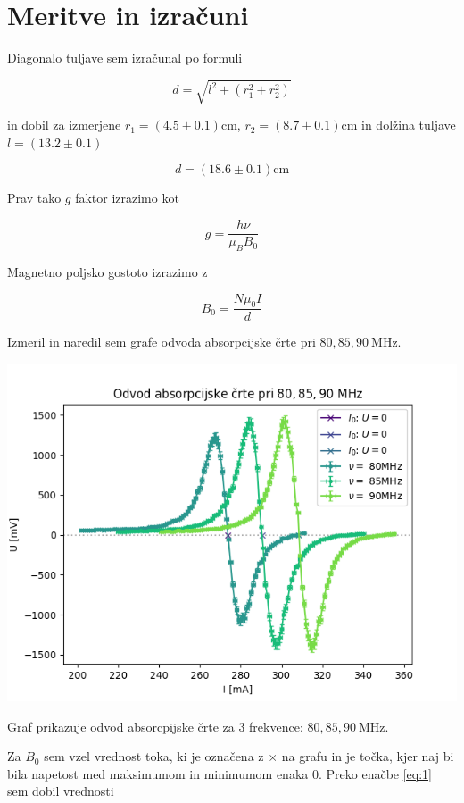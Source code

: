 \documentclass[11pt]{article}
\begin{document}
\section{Meritve in izračuni}\label{sec:org1f22431}

Diagonalo tuljave sem izračunal po formuli

\[ d = \sqrt{l ^2 + (r_1 ^2 + r_2 ^2)}
\]

in dobil za izmerjene \(r_1 = (4.5 \pm 0.1) \mathrm{cm}\), \(r_2 = (8.7 \pm 0.1) \mathrm{cm}\) in dolžina tuljave \(l = (13.2 \pm 0.1)\)

\[ d = (18.6 \pm 0.1) \mathrm{cm}
\]

Prav tako \(g\) faktor izrazimo kot

\[ g = \frac{h \nu}{\mu_B B_0}
\]

Magnetno poljsko gostoto izrazimo z

\begin{equation}
\label{eq:1}
B_0 = \frac{N \mu_0 I}{d}
\end{equation}

Izmeril in naredil sem grafe odvoda absorpcijske črte pri \(80, 85, 90 \ \mathrm{MHz}\).

\begin{slika}[H]
  \centering
  \includegraphics[width=.9\linewidth]{figures/abs_crte.png}
  \caption{\small Graf prikazuje odvod absorcpijske črte za 3 frekvence: $80, 85, 90 \ \mathrm{MHz}$.}
\end{slika}

Za \(B_0\) sem vzel vrednost toka, ki je označena z \(\times\) na grafu in je točka, kjer naj bi bila napetost med maksimumom in minimumom enaka 0. Preko enačbe \ref{eq:1} sem dobil vrednosti
\end{document}
